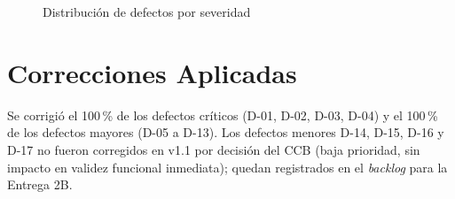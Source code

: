 \documentclass[11pt,a4paper]{article}
\begin{document}
\begin{figure}[H]
\centering
{}
\caption{Distribución de defectos por severidad}
\end{figure}

\section{Correcciones Aplicadas}
Se corrigió el 100\,\% de los defectos críticos (D-01, D-02, D-03, D-04) y el 100\,\% de los
defectos mayores (D-05 a D-13). Los defectos menores D-14, D-15, D-16 y D-17 no fueron
corregidos en v1.1 por decisión del CCB (baja prioridad, sin impacto en validez funcional
inmediata); quedan registrados en el \textit{backlog} para la Entrega 2B.
\end{document}
